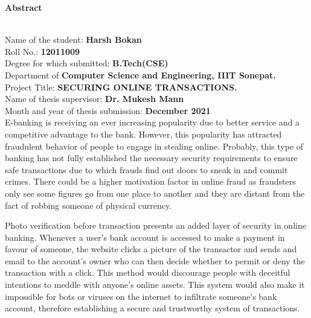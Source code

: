 \documentclass[12pt, oneside, a4paper]{article}
\begin{document}
\begin{center}
    \begin{Large}\textbf{Abstract}\end{Large}
\end{center}\\
\vspace{1cm}
Name of the student: \textbf{Harsh Bokan}\vspace{0.1cm}\\
Roll No.: \textbf{12011009}
\vspace{0.3cm}\\
Degree for which submitted: \textbf{B.Tech(CSE)}\vspace{0.2cm}\\
Department of \textbf{Computer Science and Engineering, IIIT Sonepat.}\vspace{0.2cm}\\
Project Title: \textbf{SECURING ONLINE TRANSACTIONS.}\vspace{0.2cm}\\
Name of thesis supervisor: \textbf{Dr. Mukesh Mann}\vspace{0.2cm}\\
Month and year of thesis submission: \textbf{December 2021}
\vspace{2cm}\\
E-banking is receiving an ever increasing popularity due to better service and a competitive advantage to the bank. However, this popularity has attracted fraudulent behavior of people to engage in stealing online. Probably, this type of banking has not fully established the necessary security requirements to ensure safe transactions due to which frauds find out doors to sneak in and commit crimes. There could be a higher motivation factor in online fraud as fraudsters only see some figures go from one place to another and they are distant from the fact of robbing someone of physical currency.

\vspace{0.5cm}
Photo verification before transaction presents an added layer of security in online banking. Whenever a user's bank account is accessed to make a payment in favour of someone, the website clicks a picture of the transactor and sends and email to the account's owner who can then decide whether to permit or deny the transaction with a click. This method would discourage people with deceitful intentions to meddle with anyone's online assets. This system would also make it impossible for bots or viruses on the internet to infiltrate someone's bank account, therefore establishing a secure and trustworthy system of transactions.
\end{document}
